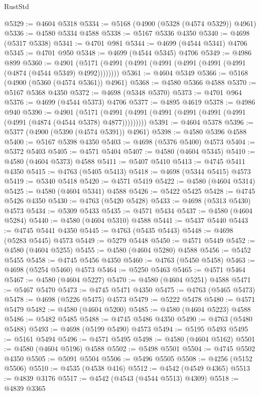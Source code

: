 \begin{lexlean}{RustStd}
\begin{coremodule}
@5329 := @4604 @5318
@5334 := @5168 (@4900 (@5328 (@4574 @5329)) @4961)
@5336 := @4580 @5334 @4588
@5338 := @5167 @5336 @4350
@5340 := @4698 (@5317 @5338)
@5341 := @4701 @981
@5344 := @4699 (@4544 @5341) @4706
@5345 := @4701 @950
@5348 := @4699 (@4544 @5345) @4706
@5349 := @4986 @899
@5360 := @4901 (@5171 (@4991 (@4991 (@4991 (@4991 (@4991 (@4991 (@4874 (@4544 @5349) @4992))))))))
@5361 := @4604 @5349
@5366 := @5168 (@4900 (@5360 (@4574 @5361)) @4961)
@5368 := @4580 @5366 @4588
@5370 := @5167 @5368 @4350
@5372 := @4698 (@5348 @5370)
@5373 := @4701 @964
@5376 := @4699 (@4544 @5373) @4706
@5377 := @4895 @4619
@5378 := @4986 @940
@5390 := @4901
    (@5171 (@4991 (@4991 (@4991 (@4991 (@4991 (@4991 (@4991 (@4874 (@4544 @5378) @4877)))))))))
@5391 := @4604 @5378
@5396 := @5377 (@4900 (@5390 (@4574 @5391)) @4961)
@5398 := @4580 @5396 @4588
@5400 := @5167 @5398 @4350
@5403 := @4698 (@5376 @5400) @4573
@5404 := @5372 @5403
@5405 := @4571 @5404
@5407 := @4580 (@4604 @5345)
@5410 := @4580 (@4604 @5373) @4588
@5411 := @5407 @5410
@5413 := @4745 @5411 @4350
@5415 := @4763 (@5405 @5413)
@5418 := @4698 (@5344 @5415) @4573
@5419 := @5340 @5418
@5420 := @4571 @5419
@5422 := @4580 (@4604 @5314)
@5425 := @4580 (@4604 @5341) @4588
@5426 := @5422 @5425
@5428 := @4745 @5426 @4350
@5430 := @4763 (@5420 @5428)
@5433 := @4698 (@5313 @5430) @4573
@5434 := @5309 @5433
@5435 := @4571 @5434
@5437 := @4580 (@4604 @5284)
@5440 := @4580 (@4604 @5310) @4588
@5441 := @5437 @5440
@5443 := @4745 @5441 @4350
@5445 := @4763 (@5435 @5443)
@5448 := @4698 (@5283 @5445) @4573
@5449 := @5279 @5448
@5450 := @4571 @5449
@5452 := @4580 (@4604 @5255)
@5455 := @4580 (@4604 @5280) @4588
@5456 := @5452 @5455
@5458 := @4745 @5456 @4350
@5460 := @4763 (@5450 @5458)
@5463 := @4698 (@5254 @5460) @4573
@5464 := @5250 @5463
@5465 := @4571 @5464
@5467 := @4580 (@4604 @5227)
@5470 := @4580 (@4604 @5251) @4588
@5471 := @5467 @5470
@5473 := @4745 @5471 @4350
@5475 := @4763 (@5465 @5473)
@5478 := @4698 (@5226 @5475) @4573
@5479 := @5222 @5478
@5480 := @4571 @5479
@5482 := @4580 (@4604 @5200)
@5485 := @4580 (@4604 @5223) @4588
@5486 := @5482 @5485
@5488 := @4745 @5486 @4350
@5490 := @4763 (@5480 @5488)
@5493 := @4698 (@5199 @5490) @4573
@5494 := @5195 @5493
@5495 := @5161 @5494
@5496 := @4571 @5495
@5498 := @4580 (@4604 @5162)
@5501 := @4580 (@4604 @5196) @4588
@5502 := @5498 @5501
@5504 := @4745 @5502 @4350
@5505 := @5091 @5504
@5506 := @5496 @5505
@5508 := @4256 (@5152 @5506)
@5510 := @4535 (@4538 @416)
@5512 := @4542 (@4549 @4365)
@5513 := @4839 @3176
@5517 := @4542 (@4543 (@4544 @5513) @4309)
@5518 := @4839 @3365

\end{coremodule}
\end{lexlean}
